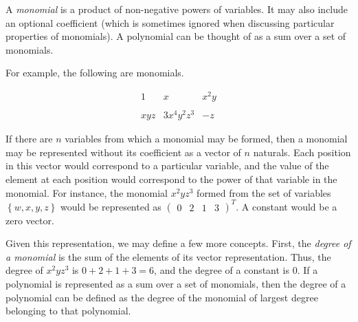 \documentclass[12pt]{article}
\begin{document}
A \emph{monomial} is a product of non-negative powers of variables.  It may also include an optional coefficient (which is sometimes ignored when discussing particular properties of monomials).  A polynomial can be thought of as a sum over a set of monomials.

For example, the following are monomials.

$$
\begin{array}{ccc}
1 & x & x^2y \\
\\
xyz & 3x^4y^2z^3 & -z
\end{array}
$$

If there are $n$ variables from which a monomial may be formed, then
a monomial may be represented without its coefficient as a vector of $n$
naturals.  Each position in this vector would correspond to a particular
variable, and the value of the element at each position would correspond
to the power of that variable in the monomial.  For instance, the monomial
$x^2yz^3$ formed from the set of variables $\left\{ w, x, y, z \right\}$
would be represented as $\begin{pmatrix}0&2&1&3\end{pmatrix}^T$.  A constant would be a zero vector.

Given this representation, we may define a few more concepts.  First, the
\emph{degree of a monomial} is the sum of the elements of its vector representation.  Thus, the degree of $x^2yz^3$ is $0 + 2 + 1 + 3 = 6$,
and the degree of a constant is 0.  If a polynomial is represented as a sum
over a set of monomials, then the degree of a polynomial can be defined as the
degree of the monomial of largest degree belonging to that polynomial.
\end{document}
